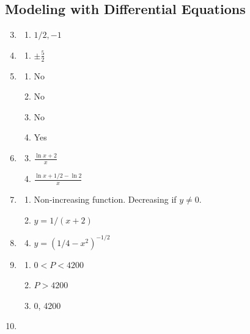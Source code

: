 \documentclass{article} \usepackage[margin=1in]{geometry}
\begin{document}
\subsection{Modeling with Differential Equations}
\begin{enumerate}
	\setcounter{enumi}{2}
	\item \begin{enumerate}
		      \item $1/2, -1$
	      \end{enumerate}
	\item \begin{enumerate}
		      \item $\pm\frac{5}{2}$
	      \end{enumerate}
	\item \begin{enumerate}
		      \item No
		      \item No
		      \item No
		      \item Yes
	      \end{enumerate}
	\item \begin{enumerate}
		      \setcounter{enumii}{2}
		      \item $\frac{\ln x+2}{x}$
		      \item $\frac{\ln x + 1/2-\ln2}{x}$
	      \end{enumerate}
	\item \begin{enumerate}
		      \item Non-increasing function. Decreasing if $y\ne0$.
		            \setcounter{enumii}{3}
		      \item $y=1/(x+2)$
	      \end{enumerate}
	\item \begin{enumerate}
		      \setcounter{enumii}{3}
		      \item $y=(1/4-x^2)^{-1/2}$
	      \end{enumerate}
	\item \begin{enumerate}
		      \item $0<P<4200$
		      \item $P>4200$
		      \item 0, 4200
	      \end{enumerate}
	\item \begin{enumerate}

\end{enumerate}
\end{enumerate}
\end{document}
